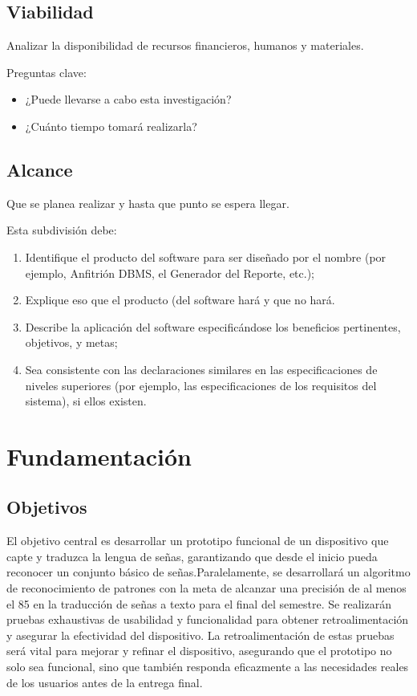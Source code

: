 \documentclass[letter,12pt]{report}
\begin{document}
\section{Viabilidad}
Analizar la disponibilidad de recursos financieros, humanos y materiales.

Preguntas clave:
  \begin{itemize}\justifying
  \item ¿Puede llevarse a cabo esta investigación?
  \item ¿Cuánto tiempo tomará realizarla?
\end{itemize}


\section{Alcance}
Que se planea realizar y hasta que punto se espera llegar.

Esta subdivisión debe:
\begin{enumerate}\justifying
  \item Identifique el producto del software para ser diseñado por el nombre (por ejemplo, Anfitrión DBMS, el Generador del Reporte, etc.);
  \item Explique eso que el producto (del software hará y que no hará.
  \item Describe la aplicación del software especificándose los beneficios pertinentes, objetivos, y metas;
  \item Sea consistente con las declaraciones similares en las especificaciones de niveles superiores (por ejemplo, las especificaciones de los requisitos del sistema), si ellos existen.
\end{enumerate}






\chapter{Fundamentación}

\section{Objetivos}\label{objetivos}

El objetivo central es desarrollar un prototipo funcional de un dispositivo que capte y traduzca la lengua de señas, garantizando que desde el inicio pueda reconocer un conjunto básico de señas.Paralelamente, se desarrollará un algoritmo de reconocimiento de patrones con la meta de alcanzar una precisión de al menos el 85 en la traducción de señas a texto para el final del semestre. Se realizarán pruebas exhaustivas de usabilidad y funcionalidad para obtener retroalimentación y asegurar la efectividad del dispositivo. La retroalimentación de estas pruebas será vital para mejorar y refinar el dispositivo, asegurando que el prototipo no solo sea funcional, sino que también responda eficazmente a las necesidades reales de los usuarios antes de la entrega final. 
\end{document}
